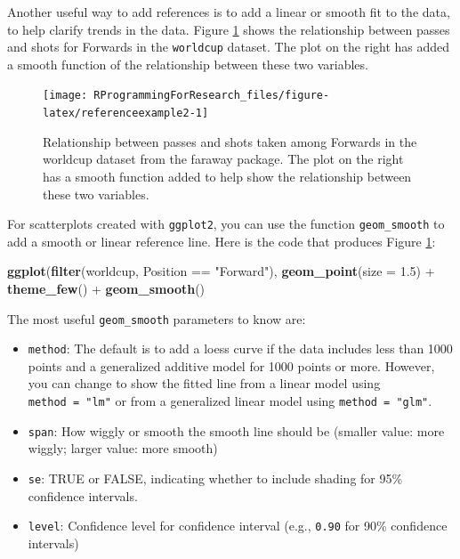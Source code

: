 \documentclass[]{book}
\makeatletter
\newenvironment{Shaded}{\begin{snugshade}}{\end{snugshade}}
\newcommand{\KeywordTok}[1]{\textcolor[rgb]{0.13,0.29,0.53}{\textbf{{#1}}}}
\newcommand{\DataTypeTok}[1]{\textcolor[rgb]{0.13,0.29,0.53}{{#1}}}
\newcommand{\FloatTok}[1]{\textcolor[rgb]{0.00,0.00,0.81}{{#1}}}
\newcommand{\StringTok}[1]{\textcolor[rgb]{0.31,0.60,0.02}{{#1}}}
\newcommand{\NormalTok}[1]{{#1}}
\providecommand{\tightlist}{%
  \setlength{\itemsep}{0pt}\setlength{\parskip}{0pt}}
\newenvironment{kframe}{%
\medskip{}
\setlength{\fboxsep}{.8em}
 \def\at@end@of@kframe{}%
 \ifinner\ifhmode%
  \def\at@end@of@kframe{\end{minipage}}%
  \begin{minipage}{\columnwidth}%
 \fi\fi%
 \def\FrameCommand##1{\hskip\@totalleftmargin \hskip-\fboxsep
 \colorbox{shadecolor}{##1}\hskip-\fboxsep
     \hskip-\linewidth \hskip-\@totalleftmargin \hskip\columnwidth}%
 \MakeFramed {\advance\hsize-\width
   \@totalleftmargin\z@ \linewidth\hsize
   \@setminipage}}%
 {\par\unskip\endMakeFramed%
 \at@end@of@kframe}
\renewenvironment{Shaded}{\begin{kframe}}{\end{kframe}}
\makeatother
\begin{document}
Another useful way to add references is to add a linear or smooth fit to
the data, to help clarify trends in the data. Figure
\ref{fig:referenceexample2} shows the relationship between passes and
shots for Forwards in the \texttt{worldcup} dataset. The plot on the
right has added a smooth function of the relationship between these two
variables.

\begin{figure}

{\centering \texttt{[image: RProgrammingForResearch\_files/figure-latex/referenceexample2-1]} 

}

\caption{Relationship between passes and shots taken among Forwards in the worldcup dataset from the faraway package. The plot on the right has a smooth function added to help show the relationship between these two variables.}\label{fig:referenceexample2}
\end{figure}

For scatterplots created with \texttt{ggplot2}, you can use the function
\texttt{geom\_smooth} to add a smooth or linear reference line. Here is
the code that produces Figure \ref{fig:referenceexample2}:

\begin{Shaded}
\begin{Highlighting}[]
\KeywordTok{ggplot}\NormalTok{(}\KeywordTok{filter}\NormalTok{(worldcup, Position ==}\StringTok{ "Forward"}\NormalTok{),}
        \KeywordTok{geom_point}\NormalTok{(}\DataTypeTok{size =} \FloatTok{1.5}\NormalTok{) +}\StringTok{ }
\StringTok{        }\KeywordTok{theme_few}\NormalTok{()  +}\StringTok{ }
\StringTok{        }\KeywordTok{geom_smooth}\NormalTok{()}
\end{Highlighting}
\end{Shaded}

The most useful \texttt{geom\_smooth} parameters to know are:

\begin{itemize}
\tightlist
\item
  \texttt{method}: The default is to add a loess curve if the data
  includes less than 1000 points and a generalized additive model for
  1000 points or more. However, you can change to show the fitted line
  from a linear model using \texttt{method\ =\ "lm"} or from a
  generalized linear model using \texttt{method\ =\ "glm"}.
\item
  \texttt{span}: How wiggly or smooth the smooth line should be (smaller
  value: more wiggly; larger value: more smooth)
\item
  \texttt{se}: TRUE or FALSE, indicating whether to include shading for
  95\% confidence intervals.
\item
  \texttt{level}: Confidence level for confidence interval (e.g.,
  \texttt{0.90} for 90\% confidence intervals)
\end{itemize}
\end{document}
